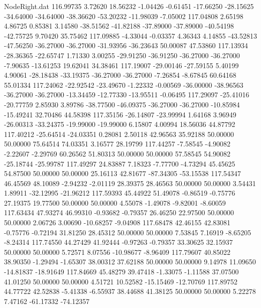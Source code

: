 \begin{filecontents}{NodeRight.dat}
 116.99735    3.72620   18.56232    -1.04426   -0.61451  -17.66250  -28.15625  -34.64000  -34.64000  -38.36620  -53.20232  -11.98039   -7.05002
 117.04808    2.65198    4.86725     0.85381    3.14580  -38.51562  -41.82188  -37.89000  -37.89000  -40.54198  -42.75725    9.70420   35.75462
 117.09885   -4.33044   -0.03357     4.36343    4.14855  -43.52813  -47.56250  -36.27000  -36.27000  -31.93956  -36.23643   50.00087   47.53860
 117.13934  -28.36365  -22.65747     1.71330    3.00255  -29.91250  -36.91250  -36.27000  -36.27000   -7.90635  -13.61253   19.62041   34.38461
 117.19007  -29.00146  -27.59155     5.40199    4.90061  -28.18438  -33.19375  -36.27000  -36.27000   -7.26854   -8.67845   60.64168   55.01334
 117.24062  -22.92542  -23.49670    -1.22332   -0.00569  -36.00000  -38.96563  -36.27000  -36.27000  -13.34459  -12.77330  -13.95511   -0.06495
 117.29097  -25.41016  -20.77759     2.85930    3.89786  -38.77500  -46.09375  -36.27000  -36.27000  -10.85984  -15.49241   32.70486   44.58398
 117.35156  -26.14807  -23.99994     1.64168    3.96949  -26.00313  -33.24375  -19.99000  -19.99000    6.15807    4.00994   18.56036   44.87792
 117.40212  -25.64514  -24.03351     0.28081    2.50118   42.96563   35.92188   50.00000   50.00000   75.64514   74.03351    3.16577   28.19799
 117.44257   -7.58545   -4.90082    -2.22607   -2.29769   60.26562   51.80313   50.00000   50.00000   57.58545   54.90082  -25.18744  -25.99787
 117.49297   24.83887    7.18323    -7.77700   -4.73294   45.45625   54.87500   50.00000   50.00000   25.16113   42.81677  -87.34305  -53.15538
 117.54347   46.45569   48.10089    -2.94232   -2.01119   28.39375   28.46563   50.00000   50.00000    3.54431    1.89911  -32.12995  -21.96212
 117.59393   45.44922   51.49078    -0.86519   -0.75776   27.19375   19.77500   50.00000   50.00000    4.55078   -1.49078   -9.82001   -8.60059
 117.63434   47.93274   46.99310    -0.93682   -0.79357   26.46250   22.97500   50.00000   50.00000    2.06726    3.00690  -10.68257   -9.04908
 117.68478   42.46155   42.83081    -0.75776   -0.72194   31.81250   28.45312   50.00000   50.00000    7.53845    7.16919   -8.65205   -8.24314
 117.74550   44.27429   41.92444    -0.97263   -0.79357   33.30625   32.15937   50.00000   50.00000    5.72571    8.07556  -10.98677   -8.96409
 117.79607   40.85022   38.90350    -1.29494   -1.65307   38.00312   37.62188   50.00000   50.00000    9.14978   11.09650  -14.81837  -18.91649
 117.84669   45.48279   39.47418    -1.33075   -1.11588   37.07500   41.01250   50.00000   50.00000    4.51721   10.52582  -15.15469  -12.70769
 117.89752   44.77722   42.52838    -5.41338   -6.55937   38.44688   41.38125   50.00000   50.00000    5.22278    7.47162  -61.17332  -74.12357

\end{filecontents}
